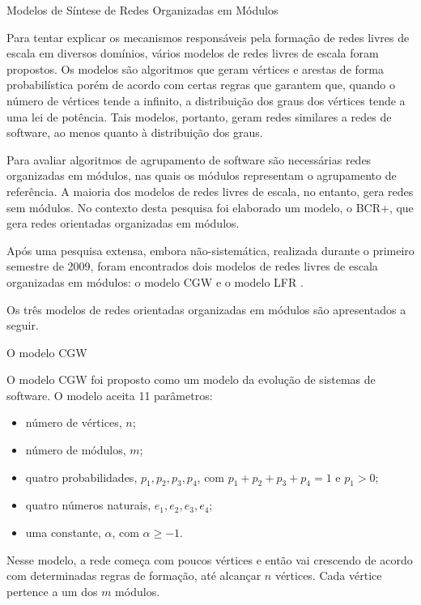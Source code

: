 \begin{section}{Modelos de Síntese de Redes Organizadas em Módulos}

Para tentar explicar os mecanismos responsáveis pela formação de redes livres de escala em diversos domínios, vários modelos de redes livres de escala foram propostos. Os modelos são algoritmos que geram vértices e arestas de forma probabilística porém de acordo com certas regras que garantem que, quando o número de vértices tende a infinito, a distribuição dos graus dos vértices tende a uma lei de potência. Tais modelos, portanto, geram redes similares a redes de software, ao menos quanto à distribuição dos graus.

Para avaliar algoritmos de agrupamento de software são necessárias redes organizadas em módulos, nas quais os módulos representam o agrupamento de referência. A maioria dos modelos de redes livres de escala, no entanto, gera redes sem módulos. No contexto desta pesquisa foi elaborado um modelo, o BCR+, que gera redes orientadas organizadas em módulos. 

Após uma pesquisa extensa, embora não-sistemática, realizada durante o primeiro semestre de 2009, foram encontrados dois modelos de redes livres de escala organizadas em módulos: o modelo CGW \cite{Chen2008} e o modelo LFR \cite{Lancichinetti2008,Lancichinetti2009}.

Os três modelos de redes orientadas organizadas em módulos são apresentados a seguir.

\begin{subsection}{O modelo CGW}

O modelo CGW \cite{Chen2008} foi proposto como um modelo da evolução de sistemas de software. O modelo aceita 11 parâmetros:

\begin{itemize}
\item número de vértices, $n$;
\item número de módulos, $m$;
\item quatro probabilidades, $p_1, p_2, p_3, p_4$, com $p_1 + p_2 + p_3 + p_4 = 1$ e $p_1 > 0$;
\item quatro números naturais, $e_1, e_2, e_3, e_4$;
\item uma constante, $\alpha$, com $\alpha \ge -1$.
\end{itemize}

Nesse modelo, a rede começa com poucos vértices e então vai crescendo de acordo com determinadas regras de formação, até alcançar $n$ vértices. Cada vértice pertence a um dos $m$ módulos.


\end{subsection}
\end{section}
